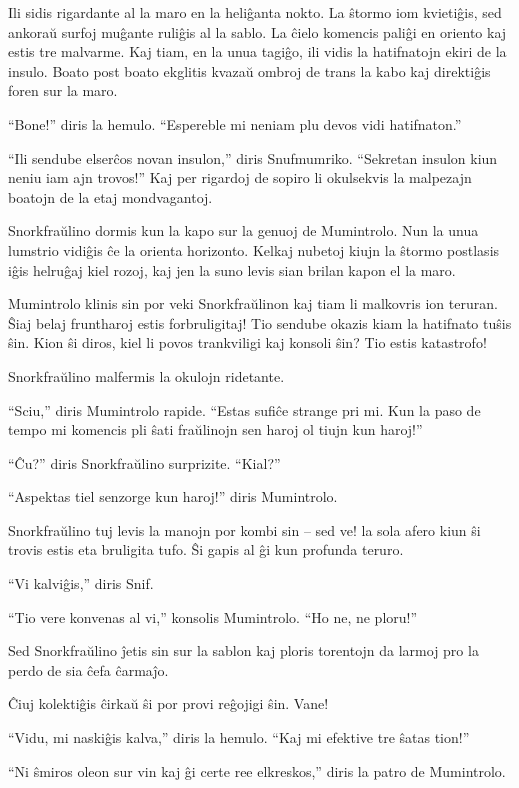 Ili sidis rigardante al la maro en la heliĝanta nokto. La ŝtormo iom kvietiĝis, sed ankoraŭ surfoj muĝante ruliĝis al la sablo. La ĉielo komencis paliĝi en oriento kaj estis tre malvarme. Kaj tiam, en la unua tagiĝo, ili vidis la hatifnatojn ekiri de la insulo. Boato post boato ekglitis kvazaŭ ombroj de trans la kabo kaj direktiĝis foren sur la maro.

``Bone!'' diris la hemulo. ``Espereble mi neniam plu devos vidi hatifnaton.''

``Ili sendube elserĉos novan insulon,'' diris Snufmumriko. ``Sekretan insulon kiun neniu iam ajn trovos!'' Kaj per rigardoj de sopiro li okulsekvis la malpezajn boatojn de la etaj mondvagantoj.

Snorkfraŭlino dormis kun la kapo sur la genuoj de Mumintrolo. Nun la unua lumstrio vidiĝis ĉe la orienta horizonto. Kelkaj nubetoj kiujn la ŝtormo postlasis iĝis helruĝaj kiel rozoj, kaj jen la suno levis sian brilan kapon el la maro.

Mumintrolo klinis sin por veki Snorkfraŭlinon kaj tiam li malkovris ion teruran. Ŝiaj belaj fruntharoj estis forbruligitaj! Tio sendube okazis kiam la hatifnato tuŝis ŝin. Kion ŝi diros, kiel li povos trankviligi kaj konsoli ŝin? Tio estis katastrofo!

Snorkfraŭlino malfermis la okulojn ridetante.

``Sciu,'' diris Mumintrolo rapide. ``Estas sufiĉe strange pri mi. Kun la paso de tempo mi komencis pli ŝati fraŭlinojn sen haroj ol tiujn kun haroj!''

``Ĉu?'' diris Snorkfraŭlino surprizite. ``Kial?''

``Aspektas tiel senzorge kun haroj!'' diris Mumintrolo.

Snorkfraŭlino tuj levis la manojn por kombi sin -- sed ve! la sola afero kiun ŝi trovis estis eta bruligita tufo. Ŝi gapis al ĝi kun profunda teruro.

``Vi kalviĝis,'' diris Snif.

``Tio vere konvenas al vi,'' konsolis Mumintrolo. ``Ho ne, ne ploru!''

Sed Snorkfraŭlino ĵetis sin sur la sablon kaj ploris torentojn da larmoj pro la perdo de sia ĉefa ĉarmaĵo.

Ĉiuj kolektiĝis ĉirkaŭ ŝi por provi reĝojigi ŝin. Vane!

``Vidu, mi naskiĝis kalva,'' diris la hemulo. ``Kaj mi efektive tre ŝatas tion!''

``Ni ŝmiros oleon sur vin kaj ĝi certe ree elkreskos,'' diris la patro de Mumintrolo.

